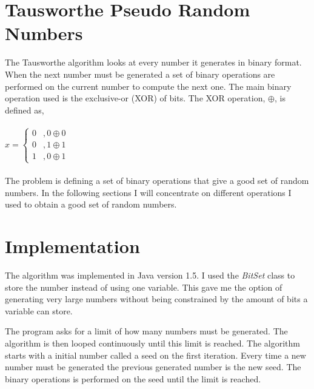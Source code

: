 \documentclass[a4paper,11pt,titlepage]{article}
\begin{document}
\section {Tausworthe Pseudo Random Numbers}
The Tausworthe algorithm looks at every number it generates in binary format. When the next number must be generated a set of binary operations are performed on the current number to compute the next one. The main binary operation used is the exclusive-or (XOR) of bits. The XOR operation, $\oplus$, is defined as,
\\\\
$
x = \left\{ \begin{array}{ll}
0 &  ,0 \oplus 0\\
0 &  ,1 \oplus 1\\
1 &  ,0 \oplus 1
\end{array}\right.
$
\\\\
The problem is defining a set of binary operations that give a good set of random numbers. In the following sections I will concentrate on different operations I used to obtain a good set of random numbers.
\section{Implementation}
The algorithm was implemented in Java version 1.5. I used the \emph{BitSet} class to store the number instead of using one variable. This gave me the option of generating very large numbers without being constrained by the amount of bits a variable can store.

The program asks for a limit of how many numbers must be generated. The algorithm is then looped continuously until this limit is reached. The algorithm starts with a initial number called a seed on the first iteration. Every time a new number must be generated the previous generated number is the new seed. The binary operations is performed on the seed until the limit is reached.
\end{document}

